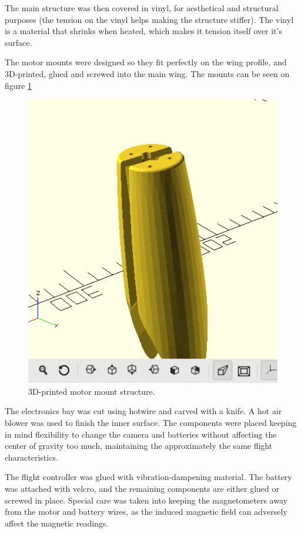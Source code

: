 The main structure was then covered in vinyl, for aesthetical and structural purposes (the tension on the vinyl helps making the structure stiffer). The vinyl is a material that shrinks when heated, which makes it tension itself over it's surface.

The motor mounts were designed so they fit perfectly on the wing profile, and 3D-printed, glued and screwed into the main wing.
The mounts can be seen on figure \ref{fig:motormount}


\begin{figure}[H]
\centering
  \includegraphics[width=\linewidth]{figs/motormount.png}
  \caption{3D-printed motor mount structure.}
  \label{fig:motormount}
\end{figure}
	

The electronics bay was cut using hotwire and carved with a knife. A hot air blower was used to finish the inner surface. The components were placed keeping in mind flexibility to change the camera and batteries without affecting the center of gravity too much, maintaining the approximately the same flight characteristics.

The flight controller was glued with vibration-dampening material. The battery was attached with velcro, and the remaining components are either glued or screwed in place. Special care was taken into keeping the magnetometers away from the motor and battery wires, as the induced magnetic field can adversely affect the magnetic readings.

